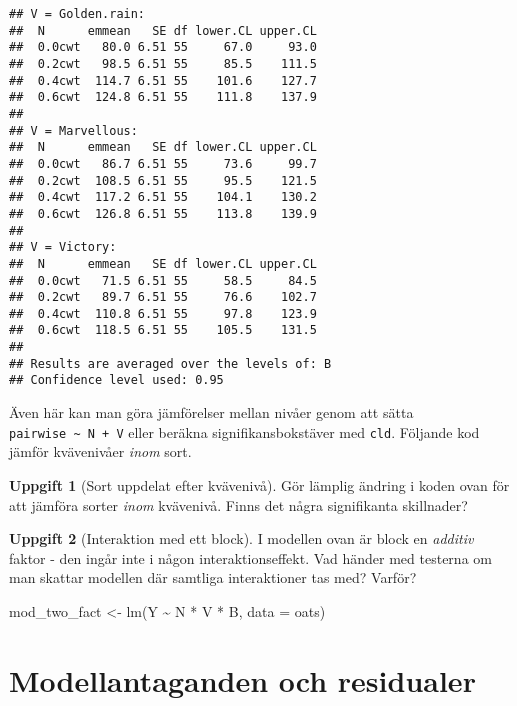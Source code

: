 \documentclass[
]{book}
\newenvironment{Shaded}{\begin{snugshade}}{\end{snugshade}}
\newcommand{\AttributeTok}[1]{\textcolor[rgb]{0.77,0.63,0.00}{#1}}
\newcommand{\FunctionTok}[1]{\textcolor[rgb]{0.00,0.00,0.00}{#1}}
\newcommand{\NormalTok}[1]{#1}
\newcommand{\OtherTok}[1]{\textcolor[rgb]{0.56,0.35,0.01}{#1}}
\newcommand{\SpecialCharTok}[1]{\textcolor[rgb]{0.00,0.00,0.00}{#1}}
\theoremstyle{definition}
\theoremstyle{definition}
\theoremstyle{definition}
\newtheorem{exercise}{Uppgift}[chapter]
\theoremstyle{definition}
\theoremstyle{remark}
\begin{document}
\begin{verbatim}
## V = Golden.rain:
##  N      emmean   SE df lower.CL upper.CL
##  0.0cwt   80.0 6.51 55     67.0     93.0
##  0.2cwt   98.5 6.51 55     85.5    111.5
##  0.4cwt  114.7 6.51 55    101.6    127.7
##  0.6cwt  124.8 6.51 55    111.8    137.9
## 
## V = Marvellous:
##  N      emmean   SE df lower.CL upper.CL
##  0.0cwt   86.7 6.51 55     73.6     99.7
##  0.2cwt  108.5 6.51 55     95.5    121.5
##  0.4cwt  117.2 6.51 55    104.1    130.2
##  0.6cwt  126.8 6.51 55    113.8    139.9
## 
## V = Victory:
##  N      emmean   SE df lower.CL upper.CL
##  0.0cwt   71.5 6.51 55     58.5     84.5
##  0.2cwt   89.7 6.51 55     76.6    102.7
##  0.4cwt  110.8 6.51 55     97.8    123.9
##  0.6cwt  118.5 6.51 55    105.5    131.5
## 
## Results are averaged over the levels of: B 
## Confidence level used: 0.95
\end{verbatim}

Även här kan man göra jämförelser mellan nivåer genom att sätta \texttt{pairwise\ \textasciitilde{}\ N\ +\ V} eller beräkna signifikansbokstäver med \texttt{cld}. Följande kod jämför kvävenivåer \emph{inom} sort.

\begin{exercise}[Sort uppdelat efter kvävenivå]
Gör lämplig ändring i koden ovan för att jämföra sorter \emph{inom} kvävenivå. Finns det några signifikanta skillnader?
\end{exercise}

\begin{exercise}[Interaktion med ett block]

I modellen ovan är block en \emph{additiv} faktor - den ingår inte i någon interaktionseffekt. Vad händer med testerna om man skattar modellen där samtliga interaktioner tas med? Varför?

\begin{Shaded}
\begin{Highlighting}[]
\NormalTok{mod\_two\_fact }\OtherTok{\textless{}{-}} \FunctionTok{lm}\NormalTok{(Y }\SpecialCharTok{\textasciitilde{}}\NormalTok{ N }\SpecialCharTok{*}\NormalTok{ V }\SpecialCharTok{*}\NormalTok{ B, }\AttributeTok{data =}\NormalTok{ oats)}
\end{Highlighting}
\end{Shaded}

\end{exercise}

\hypertarget{modellantaganden-och-residualer}{%
\section{Modellantaganden och residualer}\label{modellantaganden-och-residualer}}
\end{document}
